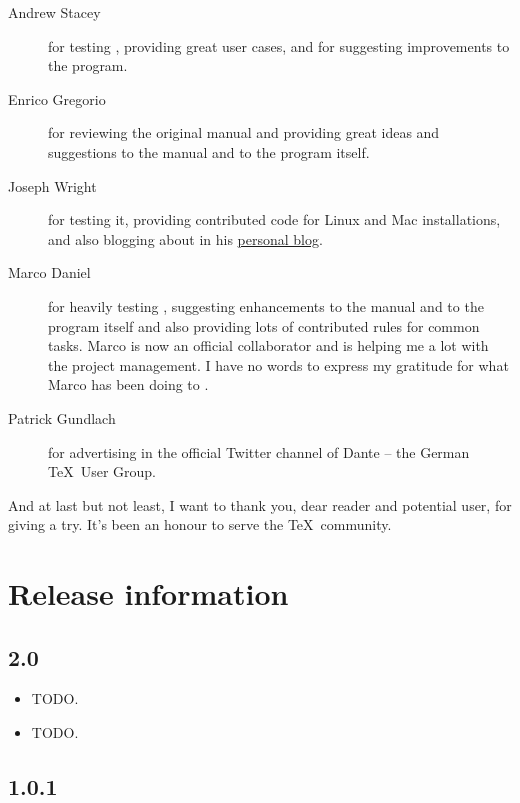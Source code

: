 \documentclass[a4paper,twoside,12pt]{memoir}
\begin{document}
\begin{description}
\item[Andrew Stacey] for testing \arara, providing great user cases, and for 
                     suggesting improvements to the program.
\item[Enrico Gregorio] for reviewing the original manual and providing great 
                       ideas and suggestions to the manual and to the program 
                       itself.
\item[Joseph Wright] for testing it, providing contributed code for Linux and Mac
                     installations, and also blogging about \arara in his 
                     \href{http://www.texdev.net}{personal blog}.
\item[Marco Daniel] for heavily testing \arara, suggesting enhancements to the 
                    manual and to the program itself and also providing lots of 
                    contributed rules for common tasks. Marco is now an official
                    collaborator and is helping me a lot with the project
                    management. I have no words to express my gratitude for what
                    Marco has been doing to \arara.
\item[Patrick Gundlach] for advertising \arara in the official Twitter channel 
                        of Dante -- the German \TeX\ User Group.
\end{description}

And at last but not least, I want to thank you, dear reader and potential user, for giving \arara a try. It's been an honour to serve the \TeX\ community.

\cleardoublepage

\section*{Release information}

\subsection*{2.0}
\begin{itemize}
\item[\featurenew] TODO.
\item[\featurefixed] TODO.
\end{itemize}
\subsection*{1.0.1}
\end{document}
